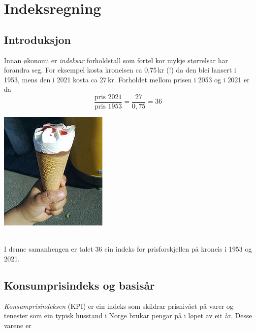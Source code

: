 




\newpage
\section{Indeksregning}
\subsection{Introduksjon}
\parbox{0.6\linewidth}{Innan økonomi er \textit{indeksar} forholdstall som fortel kor mykje størrelsar har forandra seg. For eksempel kosta kroneisen ca 0,75\,kr (!) da den blei lansert i 1953, mens den i 2021 kosta ca 27\,kr. Forholdet mellom prisen i 2053 og i 2021 er da
	\[ \frac{\text{pris 2021}}{\text{pris 1953}}=\frac{27}{0,75}= 36 \]
}
\parbox[r]{0.3\linewidth}{\includegraphics[scale=2]{kr}}\\[2pt]
I denne samanhengen er talet 36 ein indeks for prisforskjellen på kroneis i 1953 og 2021.

\subsection{Konsumprisindeks og basisår}
\textit{Konsumprisindeksen} (KPI) er ein indeks som skildrar prisnivået på varer og tenester som ein typisk husstand i Norge brukar pengar på i løpet av eit år. Desse varene er \vs

